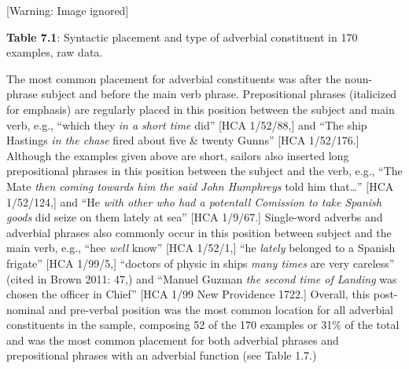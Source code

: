 \begin{styleStandard}
  [Warning: Image ignored] %
 
\end{styleStandard}

\begin{center}
 [Warning: Image ignored] %

\end{center}
\begin{styleStandard}
\textbf{Table 7.1}: Syntactic placement and type of adverbial constituent in 170 examples, raw data.
\end{styleStandard}

\begin{styleStandard}
The most common placement for adverbial constituents was after the noun-phrase subject and before the main verb phrase. Prepositional phrases (italicized for emphasis) are regularly placed in this position between the subject and main verb, e.g., “which they \textit{in a short time }did” [HCA 1/52/88,] and “The ship Hastings \textit{in the chase} fired about five \& twenty Gunns” [HCA 1/52/176.] Although the examples given above are short, sailors also inserted long prepositional phrases in this position between the subject and the verb, e.g., “The Mate \textit{then coming towards him the said John Humphreys} told him that…” [HCA 1/52/124,] and “He \textit{with other who had a potentall Comission to take Spanish goods} did seize on them lately at sea” [HCA 1/9/67.] Single-word adverbs and adverbial phrases also commonly occur in this position between subject and the main verb, e.g., “hee \textit{well} know” [HCA 1/52/1,] “he \textit{lately} belonged to a Spanish frigate” [HCA 1/99/5,] “doctors of physic in ships \textit{many times} are very careless” (cited in Brown 2011: 47,) and “Manuel Guzman \textit{the second time of Landing} was chosen the officer in Chief” [HCA 1/99 New Providence 1722.] Overall, this post-nominal and pre-verbal position was the most common location for all adverbial constituents in the sample, composing 52 of the 170 examples or 31\% of the total and was the most common placement for both adverbial phrases and prepositional phrases with an adverbial function (see Table 1.7.) 
\end{styleStandard}

